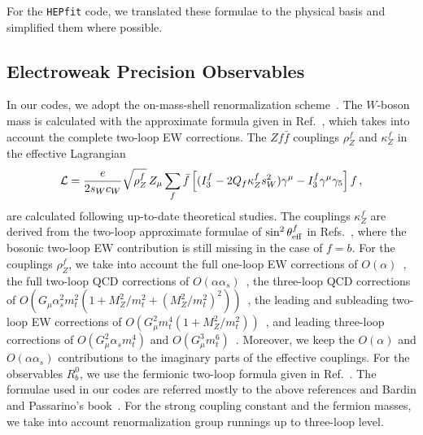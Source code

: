 \documentclass[preprint,3p,12pt]{elsarticle}
\newcommand{\HEPfit}{\texttt{HEPfit}\xspace}
\newcommand{\satoshisnotes}[1]{{\color{blue}  #1}}
\begin{document}
For the \HEPfit code, we translated these formulae to the physical basis and simplified them where possible.

\subsection{Electroweak Precision Observables}
\label{sec:EWPO}

\satoshisnotes{%
In our codes, we adopt the 
on-mass-shell renormalization
scheme~\cite{Sirlin:1980nh,Marciano:1980pb,Bardin:1980fe,Bardin:1981sv}.
The $W$-boson mass is calculated with the approximate formula given in
Ref.~\cite{Awramik:2003rn}, which takes 
into account the complete two-loop EW corrections. 
The $Zf\bar{f}$ couplings $\rho_Z^f$ and $\kappa_Z^f$ in the effective
Lagrangian 
\begin{eqnarray}
\label{eq:gvga}
{\cal L}
=
\frac{e}{2 s_W c_W}\sqrt{\rho_Z^f}\,
Z_\mu \sum_f \bar{f}
\left[( I_3^f - 2Q_f\kappa_Z^f s_W^2)\gamma^\mu 
  - I_3^f\gamma^\mu\gamma_5\right]f\,,
\end{eqnarray}
are calculated following up-to-date theoretical studies. The couplings 
$\kappa_Z^f$ are derived from the two-loop approximate formulae of 
$\sin^2\theta_{\rm eff}^{f}$ in
Refs.~\cite{Awramik:2004ge,Awramik:2006uz,Awramik:2008gi}, where the
bosonic two-loop EW contribution is still missing in the case of $f=b$. 
For the couplings $\rho_Z^f$, we take into account 
the full one-loop EW corrections of
$O(\alpha)$~\cite{Sirlin:1980nh,Marciano:1980pb}, the full two-loop
QCD corrections of $O(\alpha\alpha_s)$~\cite{Djouadi:1987gn,
  Djouadi:1987di,Kniehl:1989yc,Halzen:1990je,Kniehl:1991gu,Kniehl:1992dx,Djouadi:1993ss}, 
the three-loop QCD corrections of
$O\left(G_\mu\alpha_s^2m_t^2(1+M_Z^2/m_t^2
  +(M_Z^2/m_t^2)^2)\right)$~\cite{Avdeev:1994db,Chetyrkin:1995ix,Chetyrkin:1995js},
the leading and subleading two-loop EW corrections of
$O(G_\mu^2m_t^4(1+M_Z^2/m_t^2))$~\cite{Barbieri:1992nz,Barbieri:1992dq,
  Fleischer:1993ub,Fleischer:1994cb,Degrassi:1996mg,Degrassi:1996ps,Degrassi:1999jd}, 
and leading
three-loop corrections of $O(G_\mu^2\alpha_s m_t^4)$ and
$O(G_\mu^3m_t^6)$~\cite{vanderBij:2000cg,Faisst:2003px}.
Moreover, we keep the $O(\alpha)$ and $O(\alpha\alpha_s)$
contributions to the imaginary parts of the effective couplings. 
For the observables $R_b^0$, 
we use the fermionic two-loop formula given in Ref.~\cite{Freitas:2012sy}. 
The formulae used in our codes are referred mostly to 
the above references and 
Bardin and Passarino's book~\cite{Bardin:1999ak}. 
For the strong coupling constant and the fermion masses, we take into
account renormalization group runnings up to three-loop level. 
}%
\end{document}
